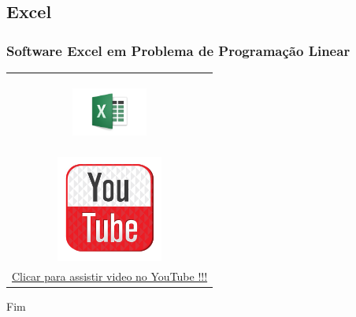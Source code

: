 \documentclass{beamer}
\begin{document}
\subsection{Excel}
\begin{frame}
	\frametitle{Software Excel em Problema de Programação Linear} 
	\centering
	\begin{table}
		\begin{tabular}{c}
			\includegraphics[width=2.5cm,height=2.5cm]{solver_excel.png} \\
			\includegraphics[width=3.5cm,height=3.5cm]{youtube.png} \\
			\href{http://www.youtube.com/watch?v=KunPQw5szeY}{Clicar para assistir video no YouTube !!!}
		\end{tabular}
	\end{table}
\end{frame} 
	
\begin{frame}
\Huge{\centerline{Fim}}
\end{frame}

\end{document}
